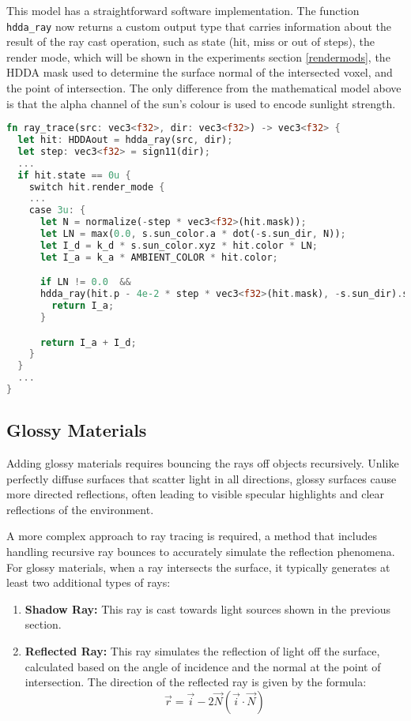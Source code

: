 This model has a straightforward software implementation. The function \texttt{hdda\_ray} now returns a custom output type that carries information
about the result of the ray cast operation, such as state (hit, miss or out of steps), the render mode, which will be shown in the experiments section \cref{rendermods},
the HDDA mask used to determine the surface normal of the intersected voxel, and the point of intersection.
The only difference from the mathematical model above is that the alpha channel of the sun's colour is used to encode sunlight strength.

\begin{lstlisting}[language=rust,caption={Sunlight rendering on diffuse materials}, captionpos=b]
fn ray_trace(src: vec3<f32>, dir: vec3<f32>) -> vec3<f32> {
  let hit: HDDAout = hdda_ray(src, dir);
  let step: vec3<f32> = sign11(dir);
  ...
  if hit.state == 0u {
    switch hit.render_mode {
    ...
    case 3u: {
      let N = normalize(-step * vec3<f32>(hit.mask));
      let LN = max(0.0, s.sun_color.a * dot(-s.sun_dir, N));
      let I_d = k_d * s.sun_color.xyz * hit.color * LN;
      let I_a = k_a * AMBIENT_COLOR * hit.color;

      if LN != 0.0  &&
      hdda_ray(hit.p - 4e-2 * step * vec3<f32>(hit.mask), -s.sun_dir).state == 0u {
        return I_a;
      }

      return I_a + I_d;
    }
  }
  ...
}
\end{lstlisting}

\subsection{Glossy Materials}
Adding glossy materials requires bouncing the rays off objects recursively. Unlike perfectly diffuse surfaces that scatter light in all directions, glossy surfaces cause more directed reflections, often leading to visible specular highlights and clear reflections of the environment.

A more complex approach to ray tracing is required, a method that includes handling recursive ray bounces to accurately simulate the reflection phenomena.
For glossy materials, when a ray intersects the surface, it typically generates at least two additional types of rays:
\begin{enumerate}
  \item \textbf{Shadow Ray:} This ray is cast towards light sources shown in the previous section.
  \item \textbf{Reflected Ray:} This ray simulates the reflection of light off the surface, calculated based on the angle of incidence and the normal at the point of intersection.
        The direction of the reflected ray is given by the formula:
        \begin{equation}
          \vec r = \vec i - 2\vec N(\vec i \cdot \vec N)
        \end{equation}
\end{enumerate}

